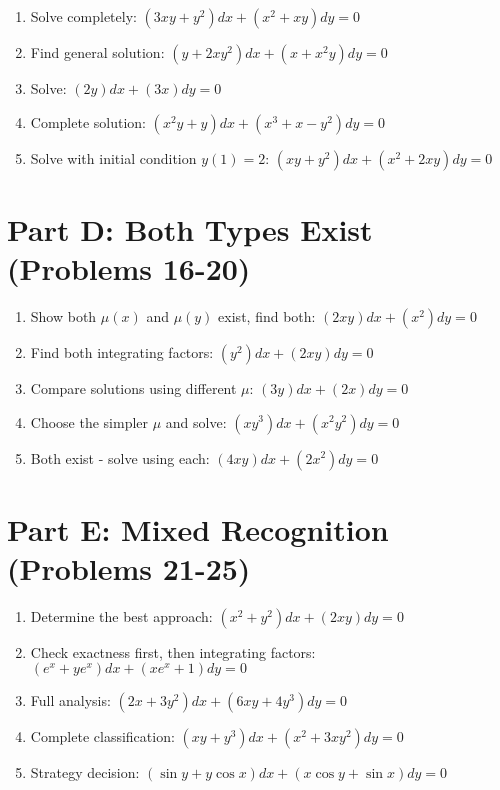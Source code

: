 \documentclass[12pt]{article}
\begin{document}
\begin{enumerate}[start=11]
\item Solve completely: $(3xy + y^2)dx + (x^2 + xy)dy = 0$

\item Find general solution: $(y + 2xy^2)dx + (x + x^2y)dy = 0$

\item Solve: $(2y)dx + (3x)dy = 0$

\item Complete solution: $(x^2y + y)dx + (x^3 + x - y^2)dy = 0$

\item Solve with initial condition $y(1) = 2$: $(xy + y^2)dx + (x^2 + 2xy)dy = 0$
\end{enumerate}

\section*{Part D: Both Types Exist (Problems 16-20)}

\begin{enumerate}[start=16]
\item Show both $\mu(x)$ and $\mu(y)$ exist, find both: $(2xy)dx + (x^2)dy = 0$

\item Find both integrating factors: $(y^2)dx + (2xy)dy = 0$

\item Compare solutions using different $\mu$: $(3y)dx + (2x)dy = 0$

\item Choose the simpler $\mu$ and solve: $(xy^3)dx + (x^2y^2)dy = 0$

\item Both exist - solve using each: $(4xy)dx + (2x^2)dy = 0$
\end{enumerate}

\section*{Part E: Mixed Recognition (Problems 21-25)}

\begin{enumerate}[start=21]
\item Determine the best approach: $(x^2 + y^2)dx + (2xy)dy = 0$

\item Check exactness first, then integrating factors: $(e^x + ye^x)dx + (xe^x + 1)dy = 0$

\item Full analysis: $(2x + 3y^2)dx + (6xy + 4y^3)dy = 0$

\item Complete classification: $(xy + y^3)dx + (x^2 + 3xy^2)dy = 0$

\item Strategy decision: $(\sin y + y\cos x)dx + (x\cos y + \sin x)dy = 0$
\end{enumerate}
\end{document}
